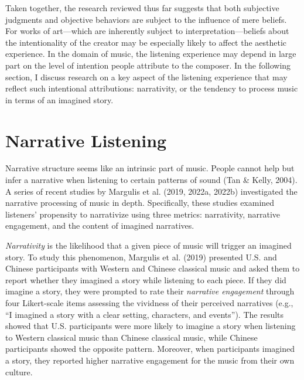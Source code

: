 \documentclass[12pt,twoside]{reedthesis}
\begin{document}
Taken together, the research reviewed thus far suggests that both subjective judgments and objective behaviors are subject to the influence of mere beliefs. For works of art—which are inherently subject to interpretation—beliefs about the intentionality of the creator may be especially likely to affect the aesthetic experience. In the domain of music, the listening experience may depend in large part on the level of intention people attribute to the composer. In the following section, I discuss research on a key aspect of the listening experience that may reflect such intentional attributions: narrativity, or the tendency to process music in terms of an imagined story. 

\section{Narrative Listening}

Narrative structure seems like an intrinsic part of music. People cannot help but infer a narrative when listening to certain patterns of sound (Tan \& Kelly, 2004). A series of recent studies by Margulis et al. (2019, 2022a, 2022b) investigated the narrative processing of music in depth. Specifically, these studies examined listeners’ propensity to narrativize using three metrics: narrativity, narrative engagement, and the content of imagined narratives. 

\emph{Narrativity} is the likelihood that a given piece of music will trigger an imagined story. To study this phenomenon, Margulis et al. (2019) presented U.S. and Chinese participants with Western and Chinese classical music and asked them to report whether they imagined a story while listening to each piece. If they did imagine a story, they were prompted to rate their \emph{narrative engagement} through four Likert-scale items assessing the vividness of their perceived narratives (e.g., “I imagined a story with a clear setting, characters, and events”). The results showed that U.S. participants were more likely to imagine a story when listening to Western classical music than Chinese classical music, while Chinese participants showed the opposite pattern. Moreover, when participants imagined a story, they reported higher narrative engagement for the music from their own culture. 
\end{document}
